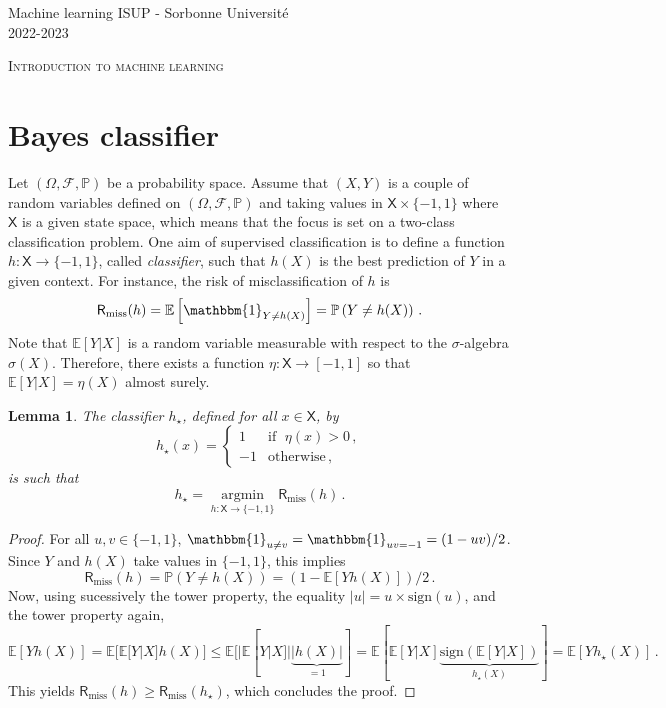 \documentclass[a4paper,10pt,fleqn]{article}
\newcommand{\eqsp}{\,}
\newcommand{\calF}{\mathcal{F}}
\newcommand{\bP}{\mathbb{P}}
\newcommand{\pE}{\ensuremath{\mathbb{E}}}
\newcommand{\xset}{\ensuremath{\mathsf{X}}}
\newcommand{\1}{\ensuremath{\mathbbm{1}}}
\newcommand{\PP}{\ensuremath{\mathbb{P}}}
\newcommand{\bE}{\mathbb{E}}
\newcommand{\argmin}{\mathop{\textrm{argmin}}}
\newtheorem{lemma}{Lemma}
\begin{document}
\noindent Machine learning \hfill ISUP - Sorbonne Universit\'e \\
 2022-2023

\noindent\hrulefill

\begin{center}
\textsc{Introduction to machine learning}
\end{center}
\hrulefill

\section{Bayes classifier}

Let $(\Omega,\calF,\bP)$ be a probability space. Assume that $(X,Y)$ is a couple of random variables defined on  $(\Omega,\calF,\bP)$ and taking values in $\xset\times\{-1,1\}$ where $\xset$ is a given state space, which means that the focus is set on a two-class classification problem. One aim of supervised classification is to define a function $h: \xset \to \{-1,1\}$, called {\em classifier}, such that $h(X)$ is the best prediction of $Y$ in a given context. For instance, the risk of misclassification of $h$ is 
$$
\mathsf{R}_{\mathrm{miss}}(h) = \bE\left[\1_{Y\neq h(X)}\right] =  \bP\left(Y\neq h(X)\right)\eqsp.
$$
Note that $\bE[Y|X]$ is a random variable measurable with respect to the $\sigma$-algebra $\sigma(X)$. Therefore, there exists a function $\eta:\xset \to [-1,1]$ so that $\bE[Y|X] = \eta(X)$ almost surely.

\begin{lemma} \label{lem:bayesclassif}
The classifier $h_{\star}$, defined for all $x\in\xset$, by
$$
h_{\star}(x) = \left\{
    \begin{array}{ll}

       1 & \mbox{if }\; \eta(x)>0\eqsp, \\
        -1 & \mbox{otherwise}\eqsp,
    \end{array}
\right.
$$
is such that
$$
h_{\star} = \underset{h:\xset\to\{-1,1\}}{\argmin}\mathsf{R}_{\mathrm{miss}}(h)\eqsp.
$$
\end{lemma}

\begin{proof}
For all $u,v \in \{-1,1\}$, $\1_{u \neq v}=\1_{u v=-1}=(1-uv)/2$. Since $Y$ and $h(X)$ take values in $\{-1,1\}$, this implies
$$
\mathsf{R}_{\mathrm{miss}}(h) =\PP(Y\neq h(X)) = \left(1-\pE[Y h(X)]\right)/2\eqsp.
$$
Now, using sucessively the tower property, the equality $|u|= u\times \mathrm{sign}(u)$, and the tower property again,
$$
\pE[Y h(X)] =\pE[\pE[Y|X] h(X)] \leq \pE[|\pE[Y|X]| \underbrace{|h(X)|}_{=1}]=  \pE[\pE[Y|X] \underbrace{\mathrm{sign}(\pE[Y|X])}_{h_\star(X)}]=\pE[Y h_\star(X)]\,.
$$
This  yields $\mathsf{R}_{\mathrm{miss}}(h) \geq \mathsf{R}_{\mathrm{miss}}(h_\star)$, which concludes the proof.
\end{proof}
\end{document}
